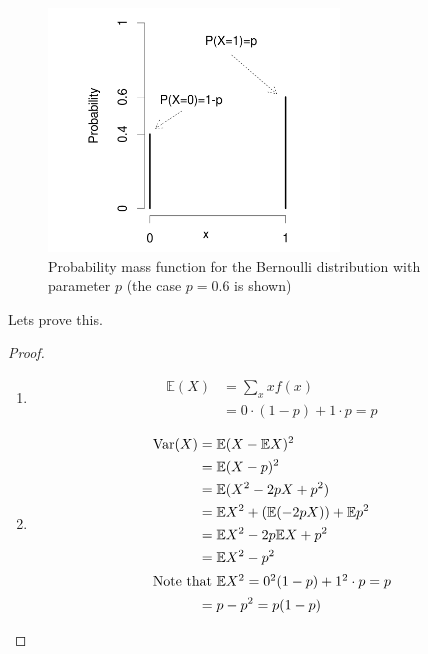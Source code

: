 \documentclass{report}
\theoremstyle{definition}
\theoremstyle{plain}
\newtheorem{theorem}{Theorem}
\theoremstyle{remark}
\begin{document}
  \begin{figure}[h]
    \centering
    \includegraphics[width=0.6\linewidth]{2.png}
    \caption{Probability mass function for the Bernoulli distribution with
    parameter $ p $ (the case $ p = 0.6 $ is shown)}%
    \label{fig:2}
  \end{figure}

  \begin{center}
  \end{center}
Lets prove this. \begin{proof}
  \begin{enumerate}
    \item \begin{align*}
  \mathbb{E}(X) &= \displaystyle \sum_{x}^{} xf(x) \\
		&= 0\cdot (1-p) + 1 \cdot p = p
\end{align*}
    \item \begin{align*}
	\text{Var}(X) &= \mathbb{E}(X-\mathbb{E}X)^2\\
	&= \mathbb{E}(X-p)^2 \\
	&= \mathbb{E}(X^2 - 2pX + p^2)\\
	&= \mathbb{E}X^2 + (\mathbb{E}(-2pX)) + \mathbb{E}p^2 \\
	&= \mathbb{E}X^2 - 2p\mathbb{E}X + p^2 \\ 
	&= \mathbb{E}X^2 - p^2 \\
	\intertext{Note that $ \mathbb{E}X^2 = 0^2(1-p) + 1^2\cdot p = p$}
	&= p - p^2 = p(1-p)
    \end{align*}
  \end{enumerate}
\end{proof}
\end{document}
